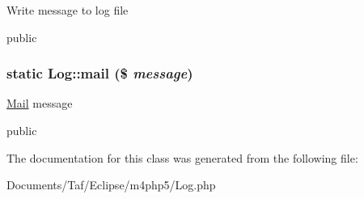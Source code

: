 Write message to log file

public \hypertarget{classLog_07af3a27afec258b5107778f7181e05b}{
\subsubsection[mail]{\setlength{\rightskip}{0pt plus 5cm}static Log::mail (\$ {\em message})}}
\label{classLog_07af3a27afec258b5107778f7181e05b}


\hyperlink{classMail}{Mail} message

public 

The documentation for this class was generated from the following file:\begin{CompactItemize}
\item 
Documents/Taf/Eclipse/m4php5/Log.php\end{CompactItemize}
